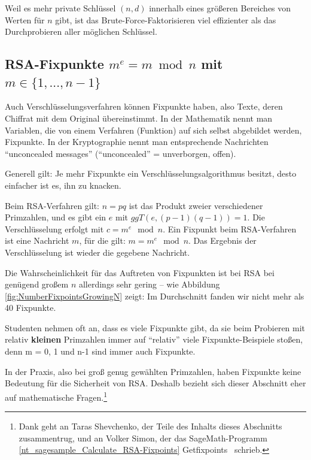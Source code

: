 \begin{refsegment}
 Weil es mehr private Schlüssel $(n, d)$ innerhalb eines größeren
Bereiches von Werten für $n$ gibt, ist das Brute-Force-Faktorisieren
viel effizienter als das Durchprobieren aller möglichen Schlüssel.




\clearpage
\newpage
\hypertarget{NumberTheory_Sage_Number-of-RSA-FixedPoints}{}
\subsection
    [RSA-Fixpunkte \texorpdfstring{}{m = m\^{}e}]%
    {RSA-Fixpunkte $ m^e = m \bmod n $ mit $m \in \{1,...,n-1\}$ }
\label{l:NumberTheory_Sage_Number-of-RSA-FixedPoints}{}

Auch Verschlüsselungsverfahren können Fixpunkte haben, also Texte, deren Chiffrat
mit dem Original übereinstimmt. In der Mathematik nennt man Variablen, die von einem
Verfahren (Funktion) auf sich selbst abgebildet werden, Fixpunkte. In der Kryptographie nennt man entsprechende Nachrichten "`unconcealed messages"' ("`unconcealed"' = unverborgen, offen).

Generell gilt: Je mehr Fixpunkte ein Verschlüsselungsalgorithmus besitzt,
desto einfacher ist es, ihn zu knacken.

Beim RSA-Verfahren gilt: $n=pq$ ist das Produkt zweier verschiedener Primzahlen, und
es gibt ein $e$ mit $ggT(e,(p-1)(q-1))=1$. Die Verschlüsselung erfolgt mit
$c = m^e \mod n$.
Ein Fixpunkt beim RSA-Verfahren ist eine Nachricht $m$, für die gilt:
$m = m^e \mod n$. Das Ergebnis der Verschlüsselung ist wieder die gegebene
Nachricht.

Die Wahrscheinlichkeit für das Auftreten von Fixpunkten ist bei RSA bei genügend
großem $n$ allerdings sehr gering -- wie Abbildung \ref{fig:NumberFixpointsGrowingN}
zeigt: Im Durchschnitt fanden wir nicht mehr als 40 Fixpunkte.

Studenten nehmen oft an, dass es viele Fixpunkte gibt, da sie beim Probieren mit
relativ \textbf{kleinen} Primzahlen immer auf "`relativ"' viele Fixpunkte-Beispiele
stoßen, denn m = 0, 1 und n-1 sind immer auch Fixpunkte.

In der Praxis, also bei groß genug gewählten Primzahlen, haben Fixpunkte keine
Bedeutung für die Sicherheit von RSA. Deshalb bezieht sich dieser Abschnitt
eher auf mathematische Fragen.\footnote{%
Dank geht an Taras Shevchenko, der Teile des Inhalts dieses Abschnitts zusammentrug, und an Volker Simon, der das SageMath-Programm \ref{nt_sagesample_Calculate_RSA-Fixpoints}
\glqq Getfixpoints\grqq~%
schrieb.}



\end{refsegment}
